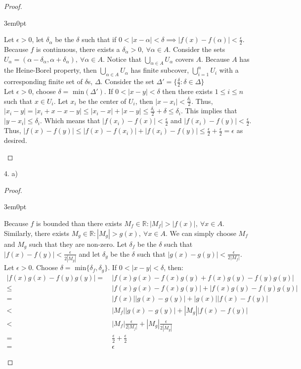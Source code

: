 \documentclass[11pt]{article}
\newcommand{\R}{\mathbb{R}}
\newenvironment{myproof}
{\begin{proof} \begin{adjustwidth}{3em}{0pt}$ $\par\nobreak\ignorespaces}
{\end{adjustwidth} \end{proof}}
\begin{document}
\begin{flushleft}
\begin{myproof}
Let $\epsilon > 0$,  let $\delta_\alpha$ be the $\delta$ such that if $0<|x-\alpha|<\delta \implies |f(x)-f(\alpha)|< \frac{\epsilon}{2}$. Because $f$ is continuous, there exists a $\delta_\alpha > 0 , \ \forall \alpha \in A$. Consider the sets $U_\alpha = (\alpha - \delta_\alpha, \alpha + \delta_\alpha), \ \forall \alpha \in A$. Notice that $\bigcup_{\alpha \in A} U_\alpha$ covers $A$. Because $A$ has the Heine-Borel property, then $\bigcup_{\alpha \in A} U_\alpha$ has finite subcover, $\bigcup_{i = 1}^n U_i$ with a corresponding finite set of $\delta$s, $\Delta$. Consider the set $\Delta' = \{ \frac{\delta}{2}: \delta \in \Delta \}$ \\
\bigskip
Let $\epsilon > 0$, choose $\delta = \text{ min}(\Delta')$. If $0<|x-y|< \delta$ then there exists $1 \leq i \leq n$ such that $x \in U_i$. Let $x_i$ be the center of $U_i$, then $|x-x_i|<\frac{\delta_i}{2}$. Thus, $|x_i-y| = |x_i +x-x-y| \leq |x_i - x| + |x - y| \leq \frac{\delta_i}{2} + \delta \leq \delta_i$. This implies that $|y-x_i| \leq \delta_i$. Which means that $|f(x_i) -f(x)|<\frac{\epsilon}{2}$ and $|f(x_i)-f(y)|<\frac{\epsilon}{2}$. Thus, $|f(x)-f(y)| \leq |f(x)-f(x_i)| + |f(x_i)-f(y)| \leq \frac{\epsilon}{2} + \frac{\epsilon}{2} = \epsilon$ as desired.
\end{myproof}

\newpage

4. a)

\begin{myproof}

Because $f$ is bounded than there exists $M_f \in \R: |M_f| > |f(x)|, \ \forall x \in A$. Similarly, there exists $M_g \in \R: |M_g| > g(x), \ \forall x \in A$. We can simply choose $M_f$ and $M_g$ such that they are non-zero. Let $\delta_f$ be the $\delta$ such that $|f(x)-f(y)|< \frac{\epsilon}{2|M_g|}$ and let $\delta_g$ be the $\delta$ such that $|g(x)-g(y)| < \frac{\epsilon}{2|M_f|}$.\\
\bigskip
Let $\epsilon > 0$. Choose $\delta = \text{ min}\{ \delta_f, \delta_g \}$. If $0<|x-y|< \delta$, then:
\begin{align*}
|f(x)g(x) - f(y)g(y)|  = & \ |f(x)g(x) -f(x)g(y) + f(x)g(y) -f(y)g(y)| \\
\leq & \ |f(x)g(x) - f(x)g(y)| + |f(x)g(y) - f(y)g(y)| \\
= & \ |f(x)||g(x) - g(y)| + |g(x)||f(x)-f(y)| \\
< & \ |M_f||g(x)-g(y)| + |M_g||f(x) - f(y)| \\
< & \ |M_f|\frac{\epsilon}{2|M_f|} + |M_g|\frac{\epsilon}{2|M_g|} \\
= & \ \frac{\epsilon}{2} + \frac{\epsilon}{2} \\
= & \ \epsilon
\end{align*}


\end{myproof}
\end{flushleft}
\end{document}
